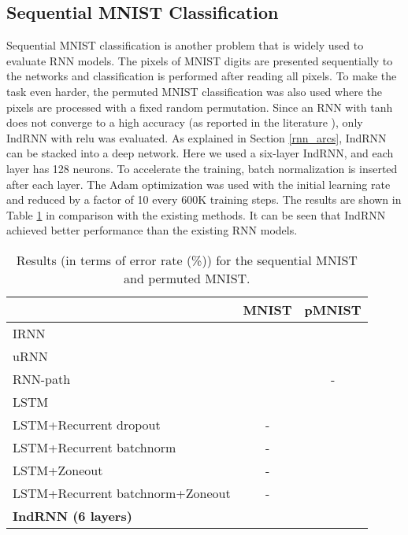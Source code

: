 \documentclass[10pt,twocolumn,letterpaper]{article}
\begin{document}
\subsection{Sequential MNIST Classification}
Sequential MNIST classification is another problem that is widely used to evaluate RNN models. The pixels of MNIST digits \cite{lecun1998gradient} are presented sequentially to the networks and classification is performed after reading all pixels. To make the task even harder, the permuted MNIST classification was also used where the pixels are processed with a fixed random permutation. Since an RNN with tanh does not converge to a high accuracy (as reported in the literature \cite{le2015simple}), only IndRNN with relu was evaluated. As explained in Section \ref{rnn_arcs}, IndRNN can be stacked into a deep network. Here we used a six-layer IndRNN, and each layer has 128 neurons. To accelerate the training, batch normalization is inserted after each layer. The Adam optimization was used with the initial learning rate  and reduced by a factor of 10 every 600K training steps. The results are shown in Table \ref{result_mnist} in comparison with the existing methods. It can be seen that IndRNN achieved better performance than the existing RNN models. 

\begin{table}
\centering
\caption{Results (in terms of error rate (\%)) for the sequential MNIST and permuted MNIST.} 
  \begin{tabular}{@{}l@{}cc}
  \hline
   & MNIST & pMNIST \\
  \hline
  IRNN \cite{le2015simple} &  &  \\
  uRNN \cite{arjovsky2015unitary} &  & \\
  RNN-path \cite{neyshabur2016path} &  & - \\
  LSTM \cite{arjovsky2015unitary} &  &  \\ 
  LSTM+Recurrent dropout \cite{semeniuta2016recurrent} & - &  \\ 
  LSTM+Recurrent batchnorm \cite{cooijmans2016recurrent} & - &  \\ 
  LSTM+Zoneout \cite{krueger2016zoneout} & - &  \\ 
  LSTM+Recurrent batchnorm+Zoneout & - &  \\ 
  \hline  
  \textbf{IndRNN (6 layers)} &  & \\
  \hline
  \end{tabular}
\label{result_mnist}
\end{table}
\end{document}
